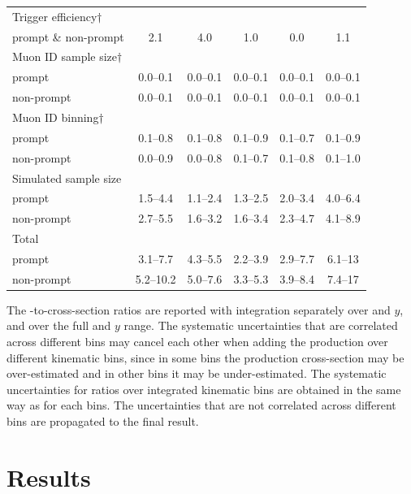 \documentclass[12pt,a4paper]{article}
\begin{document}
\begin{table}[!tbp]
\begin{center}
\begin{tabular}{l|ccccc}
    Trigger efficiency$\dagger$ & & & & &  \\
    prompt \& non-prompt & 2.1 & 4.0 & 1.0 & 0.0 & 1.1 \\ \hline
    Muon ID sample size$\dagger$ & & & & &  \\
    prompt & 0.0--0.1 & 0.0--0.1 & 0.0--0.1 & 0.0--0.1 & 0.0--0.1 \\
    non-prompt & 0.0--0.1 & 0.0--0.1 & 0.0--0.1 & 0.0--0.1 & 0.0--0.1 \\
    Muon ID binning$\dagger$ & & & & &  \\
    prompt & 0.1--0.8 & 0.1--0.8 & 0.1--0.9 & 0.1--0.7 & 0.1--0.9 \\
    non-prompt & 0.0--0.9 & 0.0--0.8 & 0.1--0.7 & 0.1--0.8 & 0.1--1.0 \\ \hline
    Simulated sample size & & & & &  \\
    prompt & 1.5--4.4 & 1.1--2.4 & 1.3--2.5 & 2.0--3.4 & 4.0--6.4 \\
    non-prompt & 2.7--5.5 & 1.6--3.2 & 1.6--3.4 & 2.3--4.7 & 4.1--8.9 \\ \hline
    Total & & & & &  \\
    prompt & 3.1--7.7 & 4.3--5.5 & 2.2--3.9 & 2.9--7.7 & 6.1--13 \\
    non-prompt &5.2--10.2 & 5.0--7.6 & 3.3--5.3 & 3.9--8.4 & 7.4--17\\ \hline
\end{tabular}
\end{center}
\label{SysU}
\end{table}

The \psitwos-to-\jpsi cross-section ratios are reported with integration separately over \pt and $y$, and over the full \pt and $y$ range. The systematic uncertainties that are correlated across different bins may cancel each other when adding the production over different kinematic bins, since in some bins the production cross-section may be over-estimated and in other bins it may be under-estimated. The systematic uncertainties for ratios over integrated kinematic bins are obtained in the same way as for each bins. The uncertainties that are not correlated across different bins are propagated to the final result.

\section{Results}
\label{sec:results}
\end{document}
